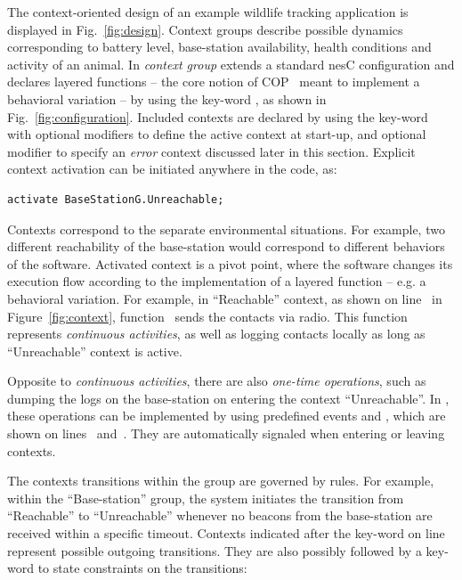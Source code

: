 The context-oriented design of an example wildlife tracking application is
displayed in Fig.~\ref{fig:design}. Context groups describe possible dynamics
corresponding to battery level, base-station availability, health conditions and
activity of an animal. In \conesc \emph{context group} extends a standard nesC
configuration and declares layered functions -- the core notion of
COP~\cite{Hirschfeld08} meant to implement a behavioral variation -- by using
the key-word , as shown in Fig.~\ref{fig:configuration}. Included
contexts are declared by using the key-word  with optional
modifiers  to define the active context at start-up, and
optional modifier  to specify an \emph{error} context discussed
later in this section. Explicit context activation can be initiated anywhere in
the code, as:

\vspace{-1mm}
\begin{lstlisting}[language=conesc]
activate BaseStationG.Unreachable;
\end{lstlisting}
\vspace{-1.5mm}

Contexts correspond to the separate environmental situations. For example, two
different reachability of the base-station would correspond to different
behaviors of the software. Activated context is a pivot point, where the
software changes its execution flow according to the implementation of a layered
function -- e.g. a behavioral variation. For example, in ``Reachable'' context,
as shown on line~ in Figure~\ref{fig:context},
function~ sends the contacts via radio. This function represents
\emph{continuous activities}, as well as logging contacts locally as long as
``Unreachable'' context is active.

Opposite to \emph{continuous activities}, there are also \emph{one-time
operations}, such as dumping the logs on the base-station on entering the
context ``Unreachable''. In \conesc, these operations can be implemented by
using predefined events  and , which are
shown on lines~ and~. They are
automatically signaled when entering or leaving contexts.

The contexts transitions within the group are governed by rules. For example,
within the ``Base-station'' group, the system initiates the transition from
``Reachable'' to ``Unreachable'' whenever no beacons from the base-station are
received within a specific timeout. Contexts indicated after the key-word
 on line  represent possible outgoing
transitions. They are also possibly followed by a key-word  to state
constraints on the transitions:


